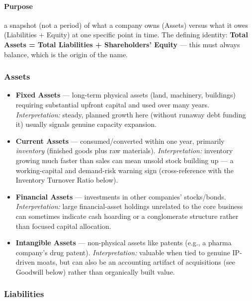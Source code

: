 \documentclass[12pt,openany]{book}
\begin{document}
\paragraph{Purpose} a snapshot (not a period) of what a company owns (Assets) versus what it owes (Liabilities + Equity) at one specific point in time. The defining identity: \textbf{Total Assets = Total Liabilities + Shareholders' Equity} --- this must always balance, which is the origin of the name.

\subsubsection{Assets}

\begin{itemize}[leftmargin=*]
    \item \textbf{Fixed Assets} --- long-term physical assets (land, machinery, buildings) requiring substantial upfront capital and used over many years. \emph{Interpretation:} steady, planned growth here (without runaway debt funding it) usually signals genuine capacity expansion.
    \item \textbf{Current Assets} --- consumed/converted within one year, primarily \emph{inventory} (finished goods plus raw materials). \emph{Interpretation:} inventory growing much faster than sales can mean unsold stock building up --- a working-capital and demand-risk warning sign (cross-reference with the Inventory Turnover Ratio below).
    \item \textbf{Financial Assets} --- investments in other companies' stocks/bonds. \emph{Interpretation:} large financial-asset holdings unrelated to the core business can sometimes indicate cash hoarding or a conglomerate structure rather than focused capital allocation.
    \item \textbf{Intangible Assets} --- non-physical assets like patents (e.g., a pharma company's drug patent). \emph{Interpretation:} valuable when tied to genuine IP-driven moats, but can also be an accounting artifact of acquisitions (see Goodwill below) rather than organically built value.
\end{itemize}

\subsubsection{Liabilities}
\end{document}
